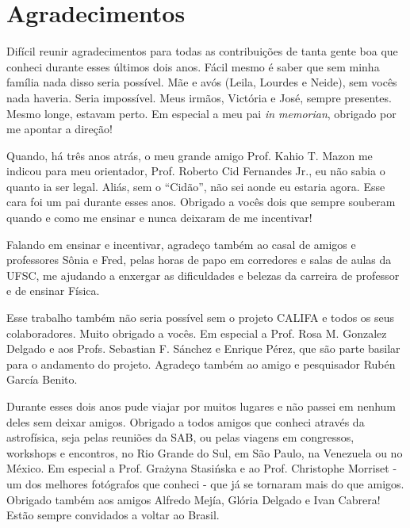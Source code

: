 

\chapter*{Agradecimentos}

Difícil reunir agradecimentos para todas as contribuições de tanta gente boa que conheci durante esses últimos dois
anos. Fácil mesmo é saber que sem minha família nada disso seria possível. Mãe e avós (Leila, Lourdes e Neide), sem
vocês nada haveria. Seria impossível. Meus irmãos, Victória e José, sempre presentes. Mesmo longe, estavam perto. Em
especial a meu pai {\em in memorian}, obrigado por me apontar a direção!

Quando, há três anos atrás, o meu grande amigo Prof. Kahio T. Mazon me indicou para meu orientador, Prof. Roberto Cid
Fernandes Jr., eu não sabia o quanto ia ser legal. Aliás, sem o ``Cidão'', não sei aonde eu estaria agora. Esse cara foi um
pai durante esses anos. Obrigado a vocês dois que sempre souberam quando e como me ensinar e nunca deixaram de me
incentivar!

Falando em ensinar e incentivar, agradeço também ao casal de amigos e professores Sônia e Fred, pelas horas de papo em
corredores e salas de aulas da UFSC, me ajudando a enxergar as dificuldades e belezas da carreira de professor e de
ensinar Física.

Esse trabalho também não seria possível sem o projeto CALIFA e todos os seus colaboradores. Muito obrigado a vocês. Em
especial a Prof. Rosa M. Gonzalez Delgado e aos Profs. Sebastian F. Sánchez e Enrique Pérez, que são parte basilar para
o andamento do projeto. Agradeço também ao amigo e pesquisador Rubén García Benito.

Durante esses dois anos pude viajar por muitos lugares e não passei em nenhum deles sem deixar amigos. Obrigado a todos
amigos que conheci através da astrofísica, seja pelas reuniões da SAB, ou pelas viagens em congressos, workshops e
encontros, no Rio Grande do Sul, em São Paulo, na Venezuela ou no México. Em especial a Prof. Gra\.zyna Stasi\'nska e ao
Prof. Christophe Morriset - um dos melhores fotógrafos que conheci - que já se tornaram mais do que amigos. Obrigado
também aos amigos Alfredo Mejía, Glória Delgado e Ivan Cabrera! Estão sempre convidados a voltar ao Brasil.

